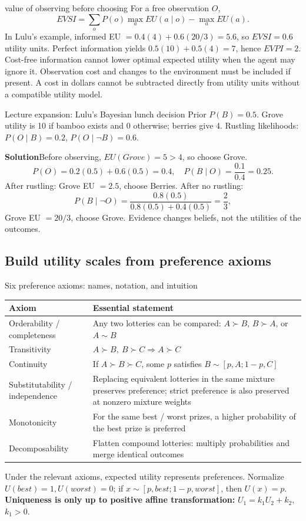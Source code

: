 \documentclass[10pt,a4paper]{article}
\newcommand{\ans}{\par\smallskip\textbf{\color{good}Solution\quad}}
\begin{document}
\begin{card}{value of observing before choosing}
For a free observation $O$,
\[
EVSI=\sum_oP(o)\max_a EU(a\mid o)-\max_a EU(a).
\]
In Lulu's example, informed EU $=0.4(4)+0.6(20/3)=5.6$, so $EVSI=0.6$ utility units. Perfect information yields $0.5(10)+0.5(4)=7$, hence $EVPI=2$. Cost-free information cannot lower optimal expected utility when the agent may ignore it. Observation cost and changes to the environment must be included if present. A cost in dollars cannot be subtracted directly from utility units without a compatible utility model.
\end{card}

\begin{question}{Lecture expansion: Lulu's Bayesian lunch decision}
Prior $P(B)=0.5$. Grove utility is 10 if bamboo exists and 0 otherwise; berries give 4. Rustling likelihoods: $P(O\mid B)=0.2$, $P(O\mid\neg B)=0.6$.
\ans Before observing, $EU(Grove)=5>4$, so choose Grove.
\[
P(O)=0.2(0.5)+0.6(0.5)=0.4,\quad P(B\mid O)=\frac{0.1}{0.4}=0.25.
\]
After rustling: Grove EU $=2.5$, choose Berries. After no rustling:
\[
P(B\mid\neg O)=\frac{0.8(0.5)}{0.8(0.5)+0.4(0.5)}=\frac23,
\]
Grove EU $=20/3$, choose Grove. Evidence changes beliefs, not the utilities of the outcomes.
\end{question}

\subsection{Build utility scales from preference axioms}
\begin{card}{Six preference axioms: names, notation, and intuition}
\small
\par\smallskip
\begin{tabularx}{\linewidth}{@{}P{3.2cm}Y@{}}
\toprule Axiom & Essential statement \\\midrule
Orderability / completeness & Any two lotteries can be compared: $A\succ B$, $B\succ A$, or $A\sim B$ \\
Transitivity & $A\succ B,\ B\succ C\Rightarrow A\succ C$ \\
Continuity & If $A\succ B\succ C$, some $p$ satisfies $B\sim[p,A;1-p,C]$ \\
Substitutability / independence & Replacing equivalent lotteries in the same mixture preserves preference; strict preference is also preserved at nonzero mixture weights \\
Monotonicity & For the same best / worst prizes, a higher probability of the best prize is preferred \\
Decomposability & Flatten compound lotteries: multiply probabilities and merge identical outcomes \\\bottomrule
\end{tabularx}\par\smallskip
\normalsize
Under the relevant axioms, expected utility represents preferences. Normalize $U(best)=1,U(worst)=0$; if $x\sim[p,best;1-p,worst]$, then $U(x)=p$.
\textbf{Uniqueness is only up to positive affine transformation:} $U_1=k_1U_2+k_2$, $k_1>0$.
\end{card}
\end{document}

